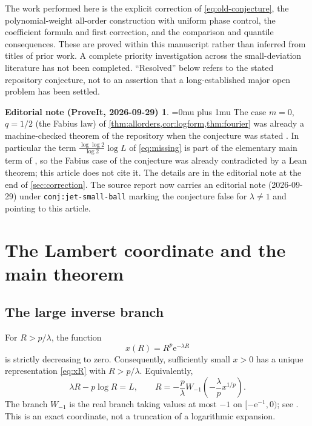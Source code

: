 \documentclass[11pt,a4paper]{article}
\numberwithin{equation}{section}
\theoremstyle{definition}
\newtheorem*{ednoteinner}{Editorial note (ProveIt, 2026-09-29)}
\newenvironment{ednote}{\begin{ednoteinner}\sloppy\Urlmuskip=0mu plus 1mu\relax}{\end{ednoteinner}}
\newcommand{\ee}{\mathrm e}
\begin{document}
The work performed here is the explicit correction of \eqref{eq:old-conjecture}, the polynomial-weight all-order construction with uniform phase control, the coefficient formula and first correction, and the comparison and quantile consequences. These are proved within this manuscript rather than inferred from titles of prior work. A complete priority investigation across the small-deviation literature has not been completed. ``Resolved'' below refers to the stated repository conjecture, not to an assertion that a long-established major open problem has been settled.
\begin{ednote}
The case $m=0$, $q=1/2$ (the Fabius law) of \cref{thm:allorders,cor:logform,thm:fourier} was already a machine-checked theorem of the repository when the conjecture was stated \cite{ed:fabiuslean}. In particular the term $\frac{\log\log2}{\log2}\log L$ of \eqref{eq:missing} is part of the elementary main term of , so the Fabius case of the conjecture was already contradicted by a Lean theorem; this article does not cite it. The details are in the editorial note at the end of \cref{sec:correction}. The source report now carries an editorial note (2026-09-29) under \texttt{conj:jet-small-ball} marking the conjecture false for $\lambda\ne1$ and pointing to this article.
\end{ednote}

\section{The Lambert coordinate and the main theorem}
\label{sec:main}

\subsection{The large inverse branch}
For $R>p/\lambda$, the function
\begin{equation}
 x(R)=R^p\ee^{-\lambda R}
 \label{eq:xR}
\end{equation}
is strictly decreasing to zero. Consequently, sufficiently small $x>0$ has a unique representation \eqref{eq:xR} with $R>p/\lambda$. Equivalently,
\begin{equation}
 \lambda R-p\log R=L,
 \qquad
 R=-\frac p\lambda W_{-1}\left(-\frac\lambda p x^{1/p}\right).
 \label{eq:lambert}
\end{equation}
The branch $W_{-1}$ is the real branch taking values at most $-1$ on $[-\ee^{-1},0)$; see \cite[\S4.13]{dlmf}. This is an exact coordinate, not a truncation of a logarithmic expansion.
\end{document}
